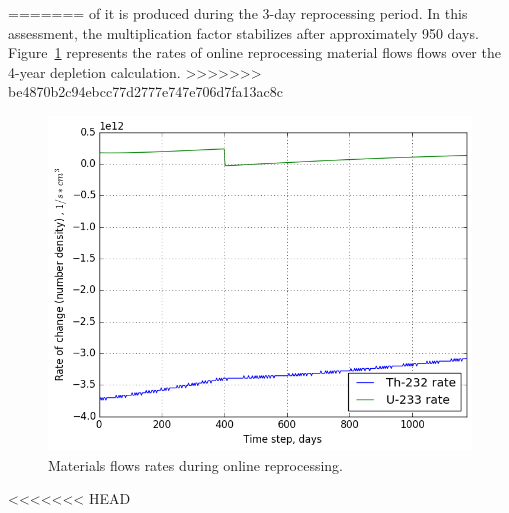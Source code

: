 \documentclass{anstrans}
\begin{document}
=======
of it is produced during the 3-day reprocessing period. In this assessment, the multiplication 
factor stabilizes after approximately 950 days. 
Figure~\ref{fig:rates} represents the rates of online reprocessing material flows
flows over the 4-year depletion calculation. 
>>>>>>> be4870b2c94ebcc77d2777e747e706d7fa13ac8c
\begin{figure}[htbp!] %
        \centering
        \includegraphics[width=1.03\linewidth]{rates_fuel.png}
        \caption{Materials flows rates during online reprocessing.}
        \label{fig:rates}
\end{figure}
<<<<<<< HEAD
\end{document}
